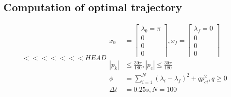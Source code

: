 \subsection{Computation of optimal trajectory}
\begin{equation}
<<<<<<< HEAD
\begin{aligned}
x_0 &= \begin{bmatrix} \lambda_0=\pi \\ 0 \\ 0 \\ 0 \end{bmatrix}, x_f=\begin{bmatrix} \lambda_f=0 \\ 0 \\ 0 \\0 \end{bmatrix}
\\
| p_k | & \leq \frac{30\pi}{180}, | p_c | \leq \frac{30\pi}{180}
\\
\phi &= \sum_{i=1}^{N}(\lambda_i - \lambda_f)^2 + qp_{ci}^2,q \geq 0
\\
\Delta t &= 0.25s, N=100
\end{aligned}
\end{equation}


